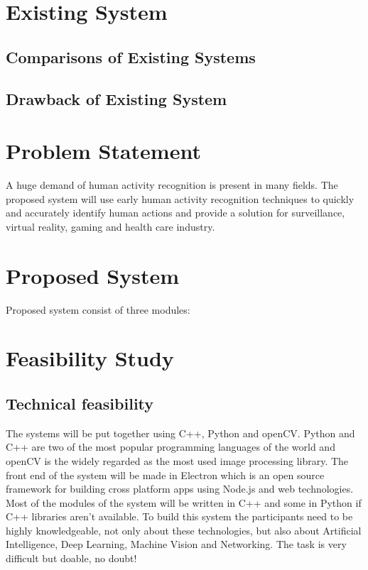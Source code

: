 \documentclass[11pt]{article}
\begin{document}
\section{\textbf{Existing System}}
\subsection{\textbf{Comparisons of Existing Systems}}

\subsection{\textbf{Drawback of Existing System}}

\section{\textbf{Problem Statement}} 
A huge demand of human activity recognition is present in many fields. The proposed system will use early human activity recognition techniques to quickly and accurately identify human actions and provide a solution for surveillance, virtual reality, gaming and health care industry. 

\section{\textbf{Proposed System}} 
      Proposed system consist of three modules:
     
\section{\textbf{Feasibility Study}}
\subsection{\textbf{Technical feasibility}}
The systems will be put together using C++, Python and openCV. Python and C++ are two of the most popular programming languages of the world and openCV is the widely regarded as the most used image processing library. The front end of the system will be made in Electron which is an open source framework for building cross platform apps using Node.js and web technologies. Most of the modules of the system will be written in C++ and some in Python if C++ libraries aren't available. To build this system the participants need to be highly knowledgeable, not only about these technologies, but also about Artificial Intelligence, Deep Learning, Machine Vision and Networking. The task is very difficult but doable, no doubt!
\end{document}
